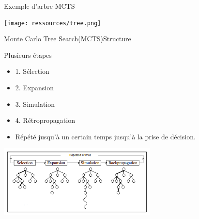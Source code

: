 \begin{frame}
	\begin{block}{Exemple d'arbre MCTS}
		\begin{center}
			\texttt{[image: ressources/tree.png]}
		\end{center}
	\end{block}
\end{frame}


\begin{frame}{Monte Carlo Tree Search(MCTS)}{Structure}
    \begin{block}{Plusieurs étapes}
	    	\begin{itemize}
	    		\item 1. Sélection
	    		\item 2. Expansion
	    		\item 3. Simulation
	    		\item 4. Rétropropagation
	    		\item Répété jusqu'à un certain temps jusqu'à la prise de décision.
	    	\end{itemize}
		\begin{center}
			\includegraphics[width=8cm]{ressources/MCTSEtapes}
		\end{center}
	\end{block}
\end{frame}

